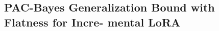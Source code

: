 \documentclass[letterpaper]{article} %
\newtheorem{theorem}{Theorem}
\begin{document}






\subsection{PAC-Bayes Generalization Bound with Flatness for Incre-
mental LoRA}
\end{document}

